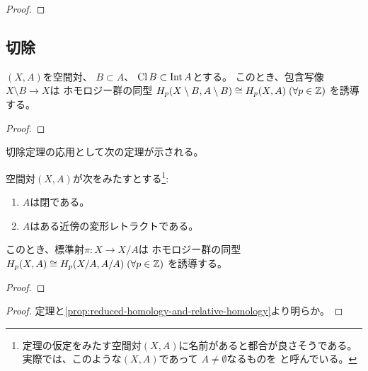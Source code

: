 \documentclass[report]{jlreq}
\begin{document}
\begin{proof}
    \TODO{}
\end{proof}

\subsection{切除}

\begin{theorem}[切除定理]
    $(X, A)$を空間対、
    $B \subset A$、
    $\operatorname{Cl} B \subset \operatorname{Int} A$とする。
    このとき、包含写像$X \setminus B \to X$は
    ホモロジー群の同型
    $H_p(X \setminus B, A \setminus B) \cong H_p(X, A) \; (\forall p \in \mathbb{Z})$
    を誘導する。
\end{theorem}

\begin{proof}
    \TODO{}
\end{proof}

切除定理の応用として次の定理が示される。

\begin{theorem}
    空間対$(X, A)$が次をみたすとする\footnote{
        定理の仮定をみたす空間対$(X, A)$に名前があると都合が良さそうである。
        実際\cite{Hat02}では、このような$(X, A)$であって
        $A \neq \emptyset$なるものを
         と呼んでいる。
    }:
    \begin{enumerate}
        \item $A$は閉である。
        \item $A$はある近傍の変形レトラクトである。
    \end{enumerate}
    このとき、標準射$\pi \colon X \to X / A$は
    ホモロジー群の同型$H_p(X, A) \cong H_p(X / A, A / A) \; (\forall p \in \mathbb{Z})$
    を誘導する。
\end{theorem}

\begin{proof}
\end{proof}


\begin{proof}
    定理と\cref{prop:reduced-homology-and-relative-homology}より明らか。
\end{proof}
\end{document}
